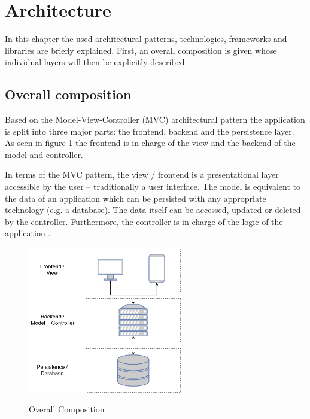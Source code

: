 
\section{Architecture}
\label{sec:DomainC}

In this chapter the used architectural patterns, technologies, frameworks and libraries are briefly explained. First, an overall composition is given whose individual layers will then be explicitly described.


\subsection{Overall composition}
\label{sec:DomainCa}
Based on the Model-View-Controller (\ac{MVC}) architectural pattern the application is split into three major parts: the frontend, backend and the persistence layer. As seen in figure \ref{fig:overallcomposition} the frontend is in charge of the view and the backend of the model and controller.

In terms of the \ac{MVC} pattern, the view / frontend is a presentational layer accessible by the user – traditionally a user interface. The model is equivalent to the data of an application which can be persisted with any appropriate technology (e.g. a database). The data itself can be accessed, updated or deleted by the controller. Furthermore, the controller is in charge of the logic of the application \cite[p. 7]{steyerWebanwendungenMitASP2017}.

\begin{figure}[h]
	\centering
	\includegraphics[width=0.6\textwidth]{Content/Domain/OverallComposition.png}
	\caption{Overall Composition}
	\cite{own representation}
	\label{fig:overallcomposition}
\end{figure}

